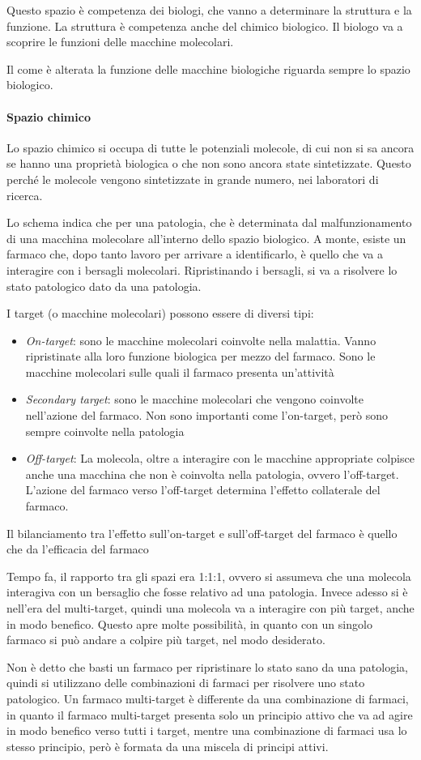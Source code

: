 Questo spazio è competenza dei biologi, che vanno a determinare la struttura e la funzione. La struttura è competenza anche del chimico biologico. Il biologo va a scoprire le funzioni delle macchine molecolari.

Il come è alterata la funzione delle macchine biologiche riguarda sempre lo spazio biologico.

\paragraph{Spazio chimico}
Lo spazio chimico si occupa di tutte le potenziali molecole, di cui non si sa ancora se hanno una proprietà biologica o che non sono ancora state sintetizzate. Questo perché le molecole vengono sintetizzate in grande numero, nei laboratori di ricerca.

Lo schema indica che per una patologia, che è determinata dal malfunzionamento di una macchina molecolare all'interno dello spazio biologico.
A monte, esiste un farmaco che, dopo tanto lavoro per arrivare a identificarlo, è quello che va a interagire con i bersagli molecolari. Ripristinando i bersagli, si va a risolvere lo stato patologico dato da una patologia.

I target (o macchine molecolari) possono essere di diversi tipi:
\begin{itemize}
\item \textit{On-target}: sono le macchine molecolari coinvolte nella malattia. Vanno ripristinate alla loro funzione biologica per mezzo del farmaco. Sono le macchine molecolari sulle quali il farmaco presenta un'attività
\item \textit{Secondary target}: sono le macchine molecolari che vengono coinvolte nell'azione del farmaco. Non sono importanti come l'on-target, però sono sempre coinvolte nella patologia
\item \textit{Off-target}: La molecola, oltre a interagire con le macchine appropriate colpisce anche una macchina che non è coinvolta nella patologia, ovvero l'off-target. L'azione del farmaco verso l'off-target determina l'effetto collaterale del farmaco.
\end{itemize}

Il bilanciamento tra l'effetto sull'on-target e sull'off-target del farmaco è quello che da l'efficacia del farmaco

Tempo fa, il rapporto tra gli spazi era 1:1:1, ovvero si assumeva che una molecola interagiva con un bersaglio che fosse relativo ad una patologia. Invece adesso si è nell'era del multi-target, quindi una molecola va a interagire con più target, anche in modo benefico.
Questo apre molte possibilità, in quanto con un singolo farmaco si può andare a colpire più target, nel modo desiderato.

Non è detto che basti un farmaco per ripristinare lo stato sano da una patologia, quindi si utilizzano delle combinazioni di farmaci per risolvere uno stato patologico.
Un farmaco multi-target è differente da una combinazione di farmaci, in quanto il farmaco multi-target presenta solo un principio attivo che va ad agire in modo benefico verso tutti i target, mentre una combinazione di farmaci usa lo stesso principio, però è formata da una miscela di principi attivi.